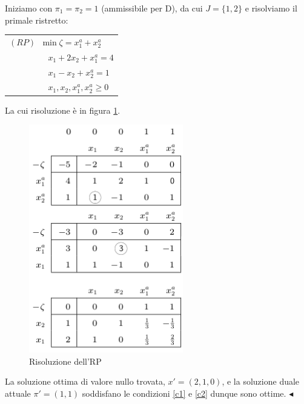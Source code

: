 \documentclass[11pt]{book}
\begin{document}
Iniziamo con $\pi_1 = \pi_2 = 1$ (ammissibile per D), da cui $J =
\{1,2\}$ e risolviamo il primale ristretto:

\vspace{11pt}
\begin{center}
\begin{tabular}{l}
$(RP)\phantom{a}\min \zeta = x_1^a + x_2^a$\\
$\phantom{(p)mina}x_1 + 2x_2 + x_1^a = 4$\\
$\phantom{(p)mina}x_1 - x_2 + x_2^a = 1$\\
$\phantom{(p)mina}x_1,x_2,x_1^a,x_2^a \geq 0$\\
\end{tabular}
\end{center}
\vspace{11pt}

La cui risoluzione \`e in figura \ref{cap5tab58}.

\begin{figure}[h!]
  \centering
  \includegraphics[width=0.6\textwidth]{images/cap5tab58.png}
  \caption{Risoluzione dell'RP}
  \label{cap5tab58}
\end{figure}

La soluzione ottima di valore nullo trovata, $x' = (2,1,0)$, e la
soluzione duale attuale $\pi' = (1,1)$ soddisfano le condizioni
\ref{c1} e \ref{c2} dunque sono ottime. $\blacktriangleleft$
\vspace{11pt}
\end{document}
